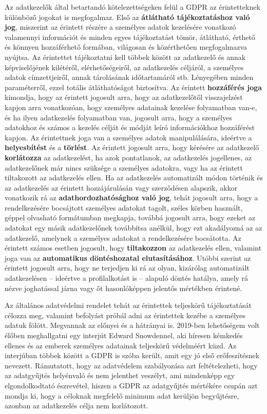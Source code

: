 Az adatkezelők által betartandó kötelezettségeken felül a GDPR az érintetteknek különböző jogokat is megfogalmaz. Első az \textbf{átlátható tájékoztatáshoz való jog}, miszerint az érintett részére a személyes adatok kezelésére vonatkozó valamennyi információt és minden egyes tájékoztatást tömör, átlátható, érthető és könnyen hozzáférhető formában, világosan és közérthetően megfogalmazva nyújtsa. Az érintettet tájékoztatni kell többek között az adatkezelő és annak képviselőjének kilétéről, elérhetőségeiről, az adatkezelés céljáról, a személyes adatok címzettjeiről, annak tárolásának időtartamáról stb. Lényegében minden paraméterről, ezzel totális átláthatóságot biztosítva. Az érintett \textbf{hozzáférés joga} kimondja, hogy az érintett jogosult arra, hogy az adatkezelőtől visszajelzést kapjon arra vonatkozóan, hogy személyes adatainak kezelése folyamatban van-e, és ha ilyen adatkezelés folyamatban van, jogosult arra, hogy a személyes adatokhoz és számos a kezelés célját és módját leíró információkhoz hozzáférést kapjon. Az érintettnek joga van a személyes adatok manipulálására, ideértve a \textbf{helyesbítést} és a \textbf{törlést}. Az érintett jogosult arra, hogy kérésére az adatkezelő \textbf{korlátozza} az adatkezelést, ha azok pontatlanok, az adatkezelés jogellenes, az adatkezelőnek már nincs szüksége a személyes adatokra, vagy ha az érintett tiltakozott az adatkezelés ellen. Ha az adatkezelés automatizált módon történik és az adatkezelés az érintett hozzájárulásán vagy szerződésen alapszik, akkor vonatkozik rá az \textbf{adathordozhatósághoz való jog}, tehát jogosult arra, hogy a rendelkezésére bocsájtott személyes adatokat tagolt, széles körben használt, géppel olvasható formátumban megkapja, továbbá jogosult arra, hogy ezeket az adatokat egy másik adatkezelőnek továbbítsa anélkül, hogy ezt akadályozná az az adatkezelő, amelynek a személyes adatokat a rendelkezésére bocsátotta. Az érintett számos esetben jogosult, hogy \textbf{tiltakozzon} az adatkezelés ellen, valamint joga van az \textbf{automatikus döntéshozatal elutasításához}. Utóbbi szerint az érintett jogosult arra, hogy ne terjedjen ki rá az olyan, kizárólag automatizált adatkezelésen – ideértve a profilalkotást is – alapuló döntés hatálya, amely rá nézve joghatással járna vagy őt hasonlóképpen jelentős mértékben érintené. \cite{GDPR}

Az általános adatvédelmi rendelet tehát az érintettek teljeskörű tájékoztatását célozza meg, valamint befolyást próbál adni az érintettek kezébe a személyes adatuk fölött. Megvannak az előnyei és a hátrányai is. 2019-ben lehetőségem volt élőben meghallgatni egy interjút \cite{Snowden} Edward Snowdennel, aki híresen kémkedés ellenes és az emberek személyes adatainak teljeskörű védelméért küzd. Az interjúban többek között a GDPR is szóba került, amit egy jó első erőfeszítésnek nevezett. Rámutatott, hogy az adatvédelem szabályozása azt feltételezheti, hogy az adatgyűjtés helyénvaló és nem jelenthet veszélyt, ami mindenképp egy elgondolkodtató észrevétel, hiszen a GDPR az adatgyűjtés mértékére csupán azt mondja ki, hogy a céloknak megfelelő minimum adat kerüljön begyűjtésre, azonban az adatkezelés célja nem korlátozott.